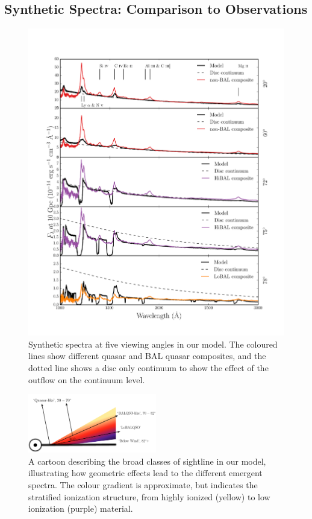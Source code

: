 \documentclass[preprint, a4paper, 11pt]{aastex}
\begin{document}
\subsection{Synthetic Spectra: Comparison to Observations}

\begin{figure} %
\centering
\includegraphics[width=1.0\textwidth]{figures/uvspec.png}
\caption
{
Synthetic spectra at five viewing angles in our model. The coloured lines
show different quasar and BAL quasar composites, and the dotted line shows a disc
only continuum to show the effect of the outflow on the continuum level.  
}
\label{fig:uvspec}
\end{figure} %

\begin{figure}
\centering
\includegraphics[width=0.5\textwidth]{figures/windnew3.png}
\caption
{
A cartoon describing the broad classes of sightline 
in our model, illustrating how geometric effects lead to 
the different emergent spectra. The colour gradient is approximate,
but indicates the stratified ionization structure, 
from highly ionized (yellow) to low ionization (purple) material.
}
\label{fig:sightline}
\end{figure}
\end{document}
